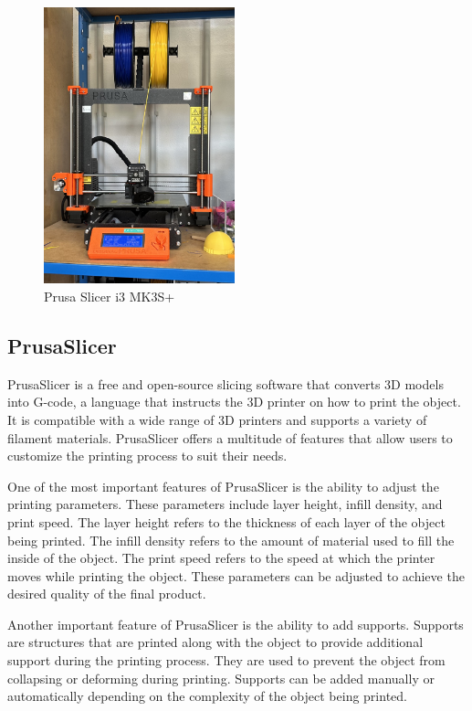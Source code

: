 \begin{figure}
    \centering
    \includegraphics[height=8cm]{texs/Part1/chapter1/image/prusa.jpg}
    \caption{Prusa Slicer i3 MK3S+}
    \label{fig:prusa_slicer_mk3}
\end{figure}

\subsection{PrusaSlicer}
\label{subsec:prusa_slicer}

PrusaSlicer is a free and open-source slicing software that converts 3D models into G-code, a language that instructs the 3D printer on how to print the object. It is compatible with a wide range of 3D printers and supports a variety of filament materials. PrusaSlicer offers a multitude of features that allow users to customize the printing process to suit their needs.

One of the most important features of PrusaSlicer is the ability to adjust the printing parameters. These parameters include layer height, infill density, and print speed. The layer height refers to the thickness of each layer of the object being printed. The infill density refers to the amount of material used to fill the inside of the object. The print speed refers to the speed at which the printer moves while printing the object. These parameters can be adjusted to achieve the desired quality of the final product.

Another important feature of PrusaSlicer is the ability to add supports. Supports are structures that are printed along with the object to provide additional support during the printing process. They are used to prevent the object from collapsing or deforming during printing. Supports can be added manually or automatically depending on the complexity of the object being printed.

